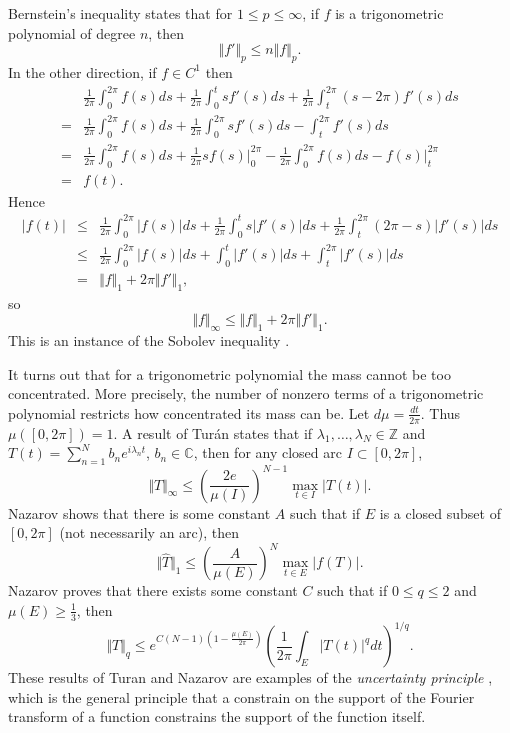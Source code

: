 \documentclass{article}
\newcommand{\norm}[1]{\Vert #1 \Vert}
\begin{document}
  
Bernstein's inequality \cite[p.~50, Exercise~7.16]{katznelson} states that for $1 \leq p \leq \infty$, if $f$
is a trigonometric polynomial of degree $n$, then
\[
\norm{f'}_p \leq n \norm{f}_p.
\]
In the other direction, if $f \in C^1$ then
\[
\begin{split}
&\frac{1}{2\pi} \int_0^{2\pi} f(s) ds +\frac{1}{2\pi} \int_0^t s f'(s) ds + \frac{1}{2\pi} \int_t^{2\pi} (s-2\pi) f'(s)ds\\
=&\frac{1}{2\pi} \int_0^{2\pi} f(s) ds+\frac{1}{2\pi} \int_0^{2\pi} s f'(s) ds - \int_t^{2\pi} f'(s) ds\\
=&\frac{1}{2\pi} \int_0^{2\pi} f(s) ds + \frac{1}{2\pi}sf(s)\Big|_0^{2\pi}-\frac{1}{2\pi} \int_0^{2\pi} f(s) ds-f(s)\Big|_t^{2\pi}\\
=&f(t).
\end{split}
\]
Hence
\begin{eqnarray*}
|f(t)|&\leq&\frac{1}{2\pi}\int_0^{2\pi} |f(s)|ds+\frac{1}{2\pi}\int_0^t s|f'(s)|ds+\frac{1}{2\pi} \int_t^{2\pi}(2\pi-s)|f'(s)|ds\\
&\leq&\frac{1}{2\pi}\int_0^{2\pi} |f(s)|ds+\int_0^t |f'(s)|ds + \int_t^{2\pi} |f'(s)| ds\\
&=&\norm{f}_1+2\pi\norm{f'}_1,
\end{eqnarray*}
so
\[
\norm{f}_\infty \leq \norm{f}_1+2\pi\norm{f'}_1.
\]
This is an instance of the Sobolev inequality \cite{oh}.

It turns out that for a trigonometric polynomial the mass cannot
be too concentrated. More precisely, the number of nonzero terms of a trigonometric polynomial restricts how concentrated its mass can be.  
Let $d\mu=\frac{dt}{2\pi}$. Thus $\mu([0,2\pi])=1$. 
A result of Tur\'an \cite[p.~89, Lemma 1]{montgomery} states that if $\lambda_1,\ldots,\lambda_N \in \mathbb{Z}$ and
$T(t)=\sum_{n=1}^N b_n e^{i\lambda_n t}$, $b_n \in \mathbb{C}$, then for any closed arc $I \subset [0,2\pi]$,
\[
\norm{T}_\infty \leq \left( \frac{2 e}{\mu(I)} \right)^{N-1} \max_{t \in I} |T(t)|.
\]
Nazarov \cite[p.~452]{havin} shows  that there is some constant $A$ such that if $E$ is a closed subset of $[0,2\pi]$ (not necessarily an arc),
then
\[
\norm{\hat{T}}_1 \leq \left( \frac{A}{\mu(E)} \right)^N \max_{t \in E} |f(T)|.
\]
Nazarov \cite{MR1771766} proves that there exists some constant $C$ such that if $0 \leq q \leq 2$ and $\mu(E)\geq \frac{1}{3}$, then 
\[
\norm{T}_q \leq e^{C(N-1)\left(1-\frac{\mu(E)}{2\pi}\right)} \left( \frac{1}{2\pi} \int_E |T(t)|^q dt \right)^{1/q}.
\]
These results of Turan and Nazarov are examples of the {\em uncertainty principle} \cite{MR1448337}, which is the general principle that a constrain on the support of the Fourier
transform of a function constrains the support of the function itself. 
\end{document}
